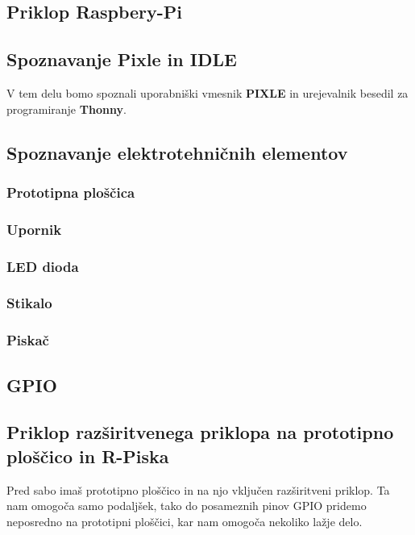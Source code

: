 \documentclass[11pt]{article}
\begin{document}
\subsection{Priklop Raspbery-Pi}
\label{sec:orge86a000}

\subsection{Spoznavanje Pixle in IDLE}
\label{sec:org789a045}
V tem delu bomo spoznali uporabniški vmesnik \textbf{PIXLE} in urejevalnik besedil
za programiranje \textbf{Thonny}.

\subsection{Spoznavanje elektrotehničnih elementov}
\label{sec:org7030264}

\subsubsection{Prototipna ploščica}
\label{sec:orgf177563}

\subsubsection{Upornik}
\label{sec:org678c60f}

\subsubsection{LED dioda}
\label{sec:org71f6d16}

\subsubsection{Stikalo}
\label{sec:org14439ec}

\subsubsection{Piskač}
\label{sec:org5efb436}


\subsection{GPIO}
\label{sec:orgea43536}

\subsection{Priklop razširitvenega priklopa na prototipno ploščico in R-Piska}
\label{sec:orgd6ffdc7}
Pred sabo imaš prototipno ploščico in na njo vključen razširitveni priklop.
Ta nam omogoča samo podaljšek, tako do posameznih pinov GPIO pridemo
neposredno na prototipni ploščici, kar nam omogoča nekoliko lažje delo.
\end{document}
